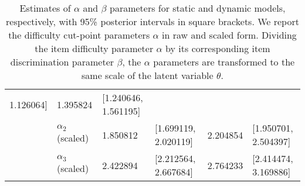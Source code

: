 \documentclass[12pt,letterpaper,leqno]{article}\usepackage[]{graphicx}\usepackage[]{color}
\begin{document}
\begin{table}[!h]
\begin{tabular}{p{.5cm}p{2cm}p{1.5cm}p{4cm}p{1.5cm}p{4cm}}
                         1.126064]
                         & 1.395824 
                         & [1.240646, 
                         1.561195]\\
 & $\alpha_{2}$ (scaled) & 1.850812 
                         & [1.699119, 
                         2.020119]
                         & 2.204854 
                         & [1.950701, 
                         2.504397]\\
 & $\alpha_{3}$ (scaled) & 2.422894 
                         & [2.212564, 
                         2.667684]
                         & 2.764233 
                         & [2.414474, 
                         3.169886]\\
\hline 
\end{tabular}
\caption{Estimates of $\alpha$ and $\beta$ parameters for static and dynamic models, respectively, with 95\% posterior  intervals in square brackets. We report the difficulty cut-point parameters $\alpha$ in raw and scaled form. Dividing the  item difficulty parameter $\alpha$ by its corresponding item discrimination parameter $\beta$, the  $\alpha$ parameters are transformed to the same scale of the latent variable $\theta$.
}\label{tb:params:alpha:beta}
\end{table}
\end{document}
